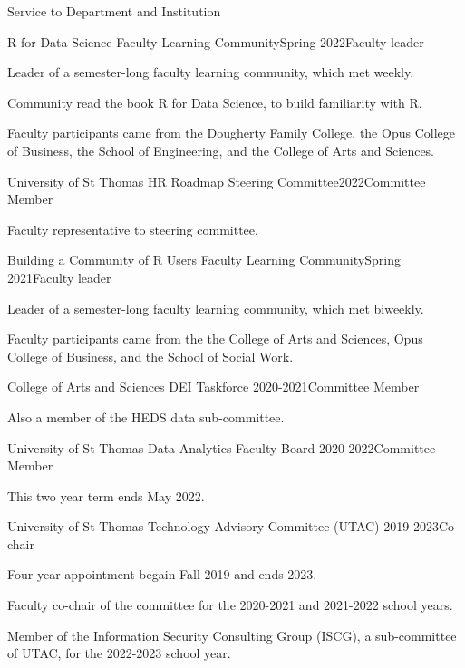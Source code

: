 \documentclass{resume} %
\begin{document}
\begin{rSection}{Service to Department and Institution}

\begin{rSubsection}{R for Data Science Faculty Learning Community}{}{Spring 2022}{Faculty leader}
\item Leader of a semester-long faculty learning community, which met weekly. 
\item Community read the book R for Data Science, to build familiarity with R.
\item Faculty participants came from the Dougherty Family College, the Opus College of Business, the School of Engineering, and the College of Arts and Sciences. 
\end{rSubsection}

\begin{rSubsection}{University of St Thomas HR Roadmap Steering Committee}{}{2022}{Committee Member}
\item Faculty representative to steering committee.
\end{rSubsection}

\begin{rSubsection}{Building a Community of R Users Faculty Learning Community}{}{Spring 2021}{Faculty leader}
\item Leader of a semester-long faculty learning community, which met biweekly. 
\item Faculty participants came from the the College of Arts and Sciences, Opus College of Business, and the School of Social Work. 
\end{rSubsection}

\begin{rSubsection}{College of Arts and Sciences DEI Taskforce}{ }{2020-2021}{Committee Member}
\item Also a member of the HEDS data sub-committee.
\end{rSubsection}

\begin{rSubsection}{University of St Thomas Data Analytics Faculty Board}{ }{2020-2022}{Committee Member}
\item This two year term ends May 2022.
\end{rSubsection}

\begin{rSubsection}{University of St Thomas Technology Advisory Committee (UTAC)}{ }{2019-2023}{Co-chair}
\item Four-year appointment begain Fall 2019 and ends 2023. 
\item Faculty co-chair of the committee for the 2020-2021 and 2021-2022 school years.
\item Member of the Information Security Consulting Group (ISCG), a sub-committee of UTAC, for the 2022-2023 school year.
\end{rSubsection}


\end{rSection}
\end{document}
